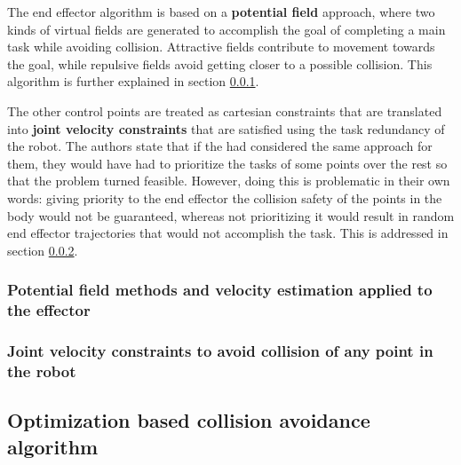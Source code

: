 The end effector algorithm is based on a \textbf{potential field} approach, where two kinds of virtual fields are generated to accomplish the goal of completing a main task while avoiding collision. Attractive fields contribute to movement towards the goal, while repulsive fields avoid getting closer to a possible collision. This algorithm is further explained in section  \ref{sss:flaccorepulsive}.

The other control points are treated as cartesian constraints that are translated into \textbf{joint velocity constraints} that are satisfied using the task redundancy of the robot. The authors state that if the had considered the same approach for them, they would have had to prioritize the tasks of some points over the rest so that the problem turned feasible. However, doing this is problematic in their own words: giving priority to the end effector the collision safety of the points in the body would not be guaranteed, whereas not prioritizing it would result in random end effector trajectories that would not accomplish the task. This is addressed in section \ref{sss:flaccobody}.

\subsubsection{Potential field methods and velocity estimation applied to the effector}
\label{sss:flaccorepulsive}

\blindtext

\subsubsection{Joint velocity constraints to avoid collision of any point in the robot}
\label{sss:flaccobody}

\blindtext

\subsection{Optimization based collision avoidance algorithm}
